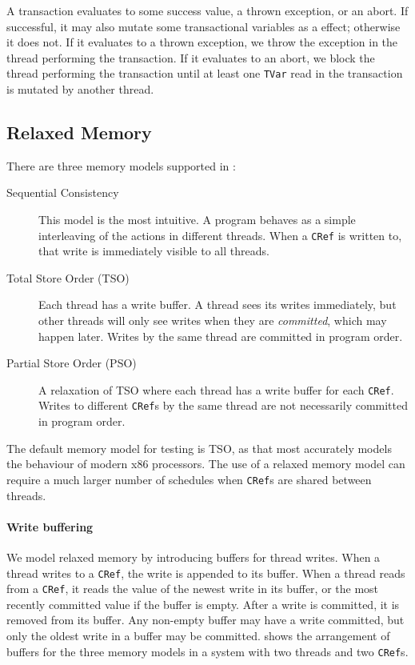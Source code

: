 A transaction evaluates to some success value, a thrown exception, or
an abort.  If successful, it may also mutate some transactional
variables as a effect; otherwise it does not.  If it evaluates to a
thrown exception, we throw the exception in the thread performing the
transaction.  If it evaluates to an abort, we block the thread
performing the transaction until at least one \verb|TVar| read in the
transaction is mutated by another thread.

\subsection{Relaxed Memory}

There are three memory models supported in \dejafu{}:

\begin{description}
\item[Sequential Consistency] This model is the most intuitive.  A program
  behaves as a simple interleaving of the actions in different threads.  When a
  \texttt{CRef} is written to, that write is immediately visible to all
  threads.

\item[Total Store Order (TSO)] Each thread has a write buffer.  A thread sees
  its writes immediately, but other threads will only see writes when they are
  \emph{committed}, which may happen later.  Writes by the same thread are
  committed in program order.

\item[Partial Store Order (PSO)] A relaxation of TSO where each thread has a
  write buffer for each \verb|CRef|.  Writes to different \verb|CRef|s by the
  same thread are not necessarily committed in program order.
\end{description}

The default memory model for testing is TSO, as that most accurately
models the behaviour of modern x86 processors\cite{owens2009}.  The
use of a relaxed memory model can require a much larger number of
schedules when \verb|CRef|s are shared between threads.

\paragraph{Write buffering}
We model relaxed memory by introducing buffers for thread writes.  When a thread
writes to a \verb|CRef|, the write is appended to its buffer.  When a thread
reads from a \verb|CRef|, it reads the value of the newest write in its buffer,
or the most recently committed value if the buffer is empty.  After a write is
committed, it is removed from its buffer.  Any non-empty buffer may have a write
committed, but only the oldest write in a buffer may be committed.  
shows the arrangement of buffers for the three memory models in a system with
two threads and two \verb|CRef|s.

